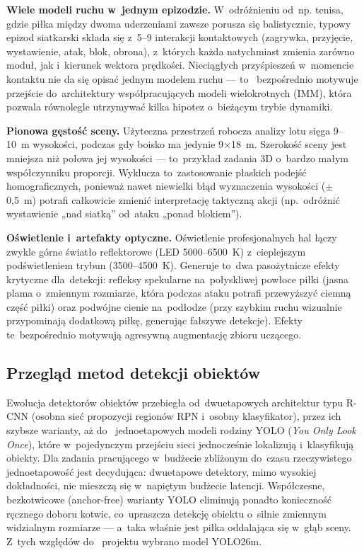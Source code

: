 \documentclass[14pt,a4paper]{extarticle}
\begin{document}
\textbf{Wiele modeli ruchu w~jednym epizodzie.} W~odróżnieniu od~np. tenisa, gdzie piłka
między dwoma uderzeniami zawsze porusza się balistycznie, typowy epizod siatkarski składa
się z~5--9 interakcji kontaktowych (zagrywka, przyjęcie, wystawienie, atak, blok, obrona),
z~których każda natychmiast zmienia zarówno moduł, jak i~kierunek wektora prędkości.
Nieciągłych przyśpieszeń w~momencie kontaktu nie da się opisać jednym modelem ruchu — to~
bezpośrednio motywuje przejście do~architektury współpracujących modeli wielokrotnych
(IMM), która pozwala równolegle utrzymywać kilka hipotez o~bieżącym trybie dynamiki.

\textbf{Pionowa gęstość sceny.} Użyteczna przestrzeń robocza analizy lotu sięga 9--10~m
wysokości, podczas gdy boisko ma jedynie 9$\times$18~m. Szerokość sceny jest mniejsza niż
połowa jej wysokości — to~przykład zadania 3D o~bardzo małym współczynniku proporcji.
Wyklucza to~zastosowanie płaskich podejść homograficznych, ponieważ nawet niewielki błąd
wyznaczenia wysokości ($\pm$0,5~m) potrafi całkowicie zmienić interpretację taktyczną
akcji (np.~odróżnić wystawienie „nad siatką” od~ataku „ponad blokiem”).

\textbf{Oświetlenie i~artefakty optyczne.} Oświetlenie profesjonalnych hal łączy zwykle
górne światło reflektorowe (LED 5000--6500~K) z~cieplejszym podświetleniem trybun
(3500--4500~K). Generuje to~dwa pasożytnicze efekty krytyczne dla~detekcji: refleksy
spekularne na~połyskliwej powłoce piłki (jasna plama o~zmiennym rozmiarze, która podczas
ataku potrafi przewyższyć ciemną część piłki) oraz podwójne cienie na~podłodze (przy
szybkim ruchu wizualnie przypominają dodatkową piłkę, generując fałszywe detekcje). Efekty
te~bezpośrednio motywują agresywną augmentację zbioru uczącego.

\subsection{Przegląd metod detekcji obiektów}
Ewolucja detektorów obiektów przebiegła od~dwuetapowych architektur typu R-CNN (osobna
sieć propozycji regionów RPN i~osobny klasyfikator), przez ich szybsze warianty, aż do~
jednoetapowych modeli rodziny YOLO (\emph{You Only Look Once}), które w~pojedynczym
przejściu sieci jednocześnie lokalizują i~klasyfikują obiekty. Dla zadania pracującego
w~budżecie zbliżonym do~czasu rzeczywistego jednoetapowość jest decydująca: dwuetapowe
detektory, mimo wysokiej dokładności, nie mieszczą się w~napiętym budżecie latencji.
Współczesne, bezkotwicowe (anchor-free) warianty YOLO eliminują ponadto konieczność
ręcznego doboru kotwic, co~upraszcza detekcję obiektu o~silnie zmiennym widzialnym
rozmiarze — a~taka właśnie jest piłka oddalająca się w~głąb sceny. Z~tych względów do~
projektu wybrano model YOLO26m.
\end{document}
